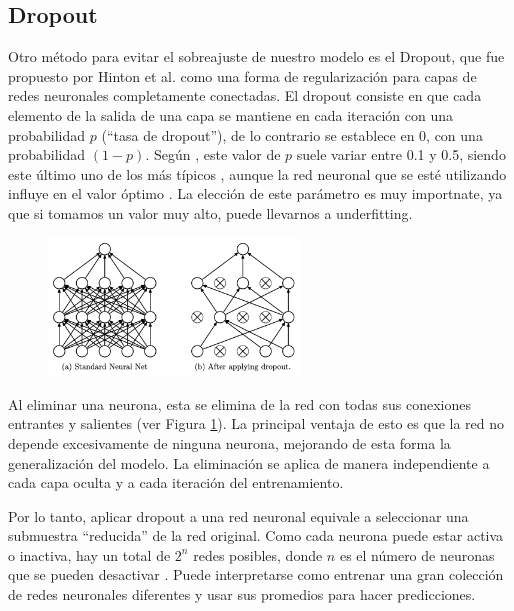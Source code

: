 \subsection{Dropout} \label{sec:dropout}

Otro método para evitar el sobreajuste de nuestro modelo es el Dropout, que fue propuesto por Hinton et al. \citep{hinton2012improving} como una forma de regularización para capas de redes neuronales completamente conectadas. El dropout consiste en que cada elemento de la salida de una capa se mantiene en cada iteración con una probabilidad \(p\) (``tasa de dropout''), de lo contrario se establece en 0, con una probabilidad \((1 - p)\). Según \citep{geron2022hands}, este valor de $p$ suele variar entre 0.1 y 0.5, siendo este último uno de los más típicos \citep{srivastava2013improving}, aunque la red neuronal que se esté utilizando influye en el valor óptimo \citep{geron2022hands}. La elección de este parámetro es muy importnate, ya que si tomamos un valor muy alto, puede llevarnos a underfitting.
    
\begin{figure}[H]
    \centering
    \includegraphics[width=0.6\textwidth]{img/dropout.png}
    \label{fig:dropout}
\end{figure}
    
Al eliminar una neurona, esta se elimina de la red con todas sus conexiones entrantes y salientes (ver Figura \ref{fig:dropout}). La principal ventaja de esto es que la red no depende excesivamente de ninguna neurona, mejorando de esta forma la generalización del modelo. La eliminación se aplica de manera independiente a cada capa oculta y a cada iteración del entrenamiento. 


Por lo tanto, aplicar dropout a una red neuronal equivale a seleccionar una submuestra ``reducida'' de la red original. Como cada neurona puede estar activa o inactiva, hay un total de $2^n$ redes posibles, donde $n$ es el número de neuronas que se pueden desactivar \citep{srivastava2013improving}. Puede interpretarse como entrenar una gran colección de redes neuronales diferentes y usar sus promedios para hacer predicciones.


